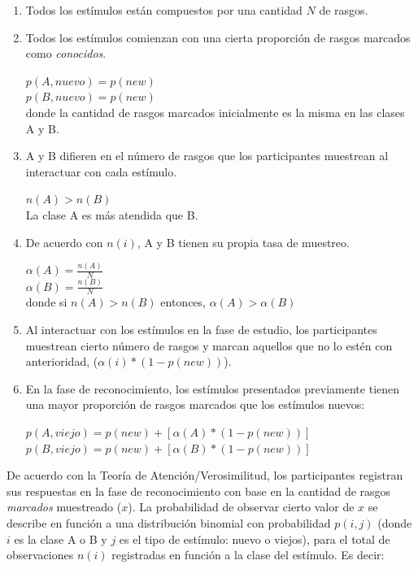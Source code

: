 \begin{enumerate}
\item Todos los estímulos están compuestos por una cantidad $N$ de rasgos.\\

\item Todos los estímulos comienzan con una cierta proporción de rasgos marcados como \textit{conocidos}.
\begin{center}
$p(A,nuevo) = p(new)$\\
$p(B,nuevo) = p(new)$\\
donde la cantidad de rasgos marcados inicialmente es la misma en las clases A y B.\\
\end{center}

\item A y B difieren en el número de rasgos que los participantes muestrean al interactuar con cada estímulo.
\begin{center}
$n(A) > n(B)$\\
La clase A es más atendida que B.\\
\end{center}

\item De acuerdo con $n(i)$, A y B tienen su propia tasa de muestreo.
\begin{center}
$\alpha(A) = \frac{n(A)}{N}$\\
$\alpha(B) = \frac{n(B)}{N}$\\
donde si $n(A) > n(B)$ entonces, $\alpha(A) > \alpha(B)$\
\end{center}

\item Al interactuar con los estímulos en la fase de estudio, los participantes muestrean cierto número de rasgos y marcan aquellos que no lo estén con anterioridad, ($\alpha(i)*(1-p(new))$).\\

\item En la fase de reconocimiento, los estímulos presentados previamente tienen una mayor proporción de rasgos marcados que los estímulos nuevos:
\begin{center}
$p(A,viejo) = p(new) + [\alpha(A)*(1-p(new))]$\\
$p(B,viejo) = p (new) + [\alpha(B)*(1-p(new))]$\\
\end{center}
\end{enumerate}

De acuerdo con la Teoría de Atención/Verosimilitud, los participantes registran sus respuestas en la fase de reconocimiento con base en la cantidad de rasgos \textit{marcados} muestreado ($x$). La probabilidad de observar cierto valor de $x$ se describe en función a una distribución binomial con probabilidad $p(i,j)$ (donde $i$ es la clase A o B y $j$ es el tipo de estímulo: nuevo o viejos), para el total de observaciones $n(i)$ registradas en función a la clase del estímulo. Es decir:

